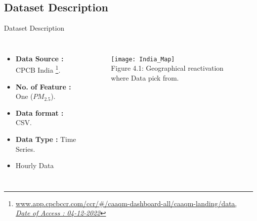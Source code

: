 \documentclass[12pt, aspectratio=169]{beamer}
\begin{document}
\subsection{Dataset Description}


\begin{frame}{Dataset Description}
	\begin{columns}
		\begin{itemize}
			\item \textbf{Data Source : }CPCB India \footnote{\href{https://app.cpcbccr.com/ccr/\#/caaqm-dashboard-all/caaqm-landing/data}{\footnotesize {www.app.cpcbccr.com/ccr/\#/caaqm-dashboard-all/caaqm-landing/data,\\ \textit{ Date of Access : 04-12-2022}}}}.
			\item \textbf{No. of Feature : }One ($PM_{2.5}$).
			\item \textbf{Data format : }CSV.
			\item \textbf{Data Type : }Time Series.
			\item Hourly Data
		\end{itemize}
		\begin{figure}
			\centering
			\texttt{[image: India\_Map]}\\ 
			\scriptsize{Figure 4.1: Geographical reactivation where Data pick from.}
		\end{figure}
	\end{columns}
	
\end{frame}
\end{document}
